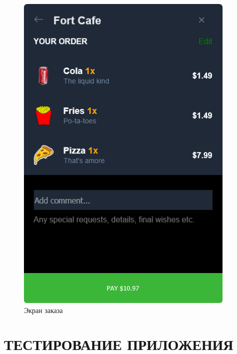 {{\begin{figure}[H]
\begin{minipage}{0.45\textwidth}
                \includegraphics[width=\textwidth]{assets/order.png}
                \caption{Экран заказа}
                \label{fig:enter_data}
            \end{minipage}
        \end{figure}
    }

    \newpage
    \section{\MakeUppercase{Тестирование приложения}}

}
